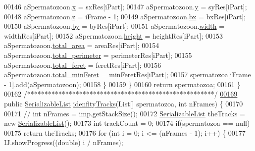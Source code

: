 \begin{DoxyCode}
00146         aSpermatozoon.\hyperlink{classdata_1_1_spermatozoon_ad0da36b2558901e21e7a30f6c227a45e}{x} = sxRes[iPart];
00147         aSpermatozoon.\hyperlink{classdata_1_1_spermatozoon_aa4f0d3eebc3c443f9be81bf48561a217}{y} = syRes[iPart];
00148         aSpermatozoon.\hyperlink{classdata_1_1_spermatozoon_a14f94e529dff0b8bfba8e16fbe9755d6}{z} = iFrame - 1;
00149         aSpermatozoon.\hyperlink{classdata_1_1_spermatozoon_a5c25ae7634a79d11d6679b6b07c240a1}{bx} = bxRes[iPart];
00150         aSpermatozoon.\hyperlink{classdata_1_1_spermatozoon_affce45e955f0a114a5569e019b8d8634}{by} = byRes[iPart];
00151         aSpermatozoon.\hyperlink{classdata_1_1_spermatozoon_ae426f00e82704fa09578f5446e22d915}{width} = widthRes[iPart];
00152         aSpermatozoon.\hyperlink{classdata_1_1_spermatozoon_a48083b65ac9a863566dc3e3fff09a5b4}{height} = heightRes[iPart];
00153         aSpermatozoon.\hyperlink{classdata_1_1_spermatozoon_ac84d85b9355bdffd37cf8632c9f72efe}{total\_area} = areaRes[iPart];
00154         aSpermatozoon.\hyperlink{classdata_1_1_spermatozoon_a893cd9ee5a9bdc16eecb9891fadd602c}{total\_perimeter} = perimeterRes[iPart];
00155         aSpermatozoon.\hyperlink{classdata_1_1_spermatozoon_ab5ab64dc3696466f1e700d20d538e436}{total\_feret} = feretRes[iPart];
00156         aSpermatozoon.\hyperlink{classdata_1_1_spermatozoon_aea69b99de4cd3bda1fc7c464bb5d842e}{total\_minFeret} = minFeretRes[iPart];
00157         spermatozoa[iFrame - 1].add(aSpermatozoon);
00158       \}
00159     \}
00160     \textcolor{keywordflow}{return} spermatozoa;
00161   \}
00162   \textcolor{comment}{/******************************************************/}
\hypertarget{_video_recognition_8java_source_l00169}{}\hyperlink{classfunctions_1_1_video_recognition_a31e3f4ea058db30f6dc0bd3d192d6b4b}{00169}   \textcolor{keyword}{public} \hyperlink{classdata_1_1_serializable_list}{SerializableList} \hyperlink{classfunctions_1_1_video_recognition_a31e3f4ea058db30f6dc0bd3d192d6b4b}{idenfityTracks}(List[] spermatozoa, \textcolor{keywordtype}{int} nFrames) \{
00170 
00171     \textcolor{comment}{// int nFrames = imp.getStackSize();}
00172     \hyperlink{classdata_1_1_serializable_list}{SerializableList} theTracks = \textcolor{keyword}{new} \hyperlink{classdata_1_1_serializable_list}{SerializableList}();
00173     \textcolor{keywordtype}{int} trackCount = 0;
00174     \textcolor{keywordflow}{if}(spermatozoa == null)
00175       \textcolor{keywordflow}{return} theTracks;
00176     \textcolor{keywordflow}{for} (\textcolor{keywordtype}{int} i = 0; i <= (nFrames - 1); i++) \{
00177       IJ.showProgress((\textcolor{keywordtype}{double}) i / nFrames);

\end{DoxyCode}
